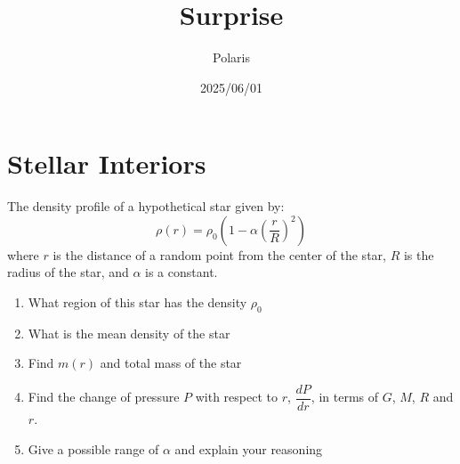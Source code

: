 \documentclass{article}
\title{Surprise}
\author{Polaris}
\date{2025/06/01}
\begin{document}
\maketitle

\section{Stellar Interiors}
The density profile of a hypothetical star given by:
\[
\rho(r) = \rho_0\left(1-\alpha\left(\frac{r}{R}\right)^2\right)
\]
where $r$ is the distance of a random point from the center of the star, $R$ is the
radius of the star, and $\alpha$ is a constant.

\begin{enumerate}
    \item What region of this star has the density $\rho_0$
    \item What is the mean density of the star
    \item Find $m(r)$ and total mass of the star
    \item Find the change of pressure $P$ with respect to $r$, $\displaystyle \dfrac{dP}{dr}$,
    in terms of $G$, $M$, $R$ and $r$.
    \item Give a possible range of $\alpha$ and explain your reasoning
\end{enumerate}

\newpage
\end{document}
